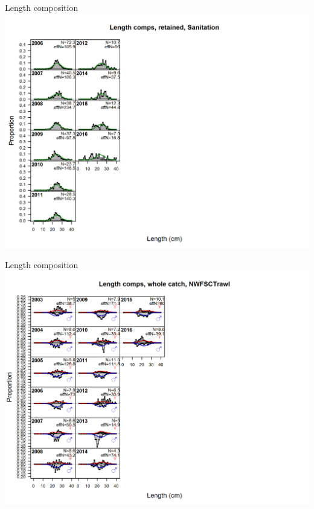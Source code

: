 \documentclass[ignorenonframetext,compress]{beamer}
\begin{document}
\begin{frame}{Length composition}\includegraphics{./r4ss/plots_mod1/comp_lenfit_flt7mkt2_page2.png}\end{frame}

\begin{frame}{Length composition}\includegraphics{./r4ss/plots_mod1/comp_lenfit_flt8mkt0.png}\end{frame}
\end{document}
